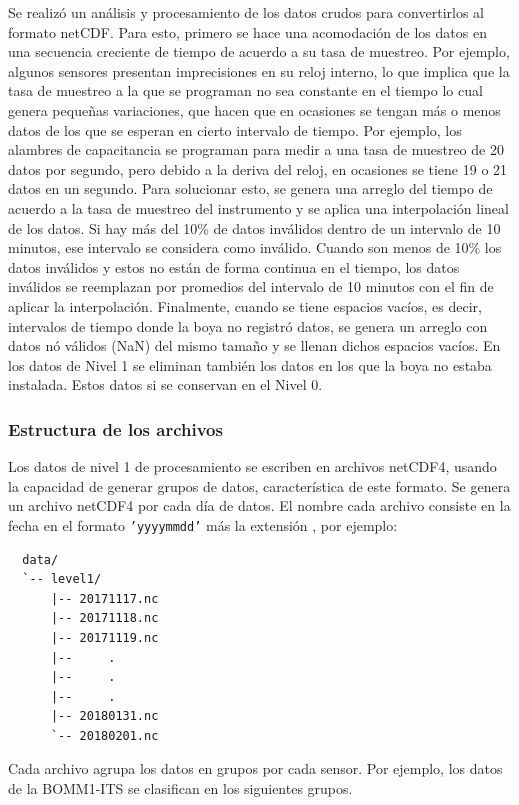 \documentclass[11pt]{article}
\begin{document}
Se realizó un análisis y procesamiento de los datos crudos para convertirlos al
formato netCDF. Para esto, primero se hace una acomodación de los datos en una
secuencia creciente de tiempo de acuerdo a su tasa de muestreo. Por ejemplo,
algunos sensores presentan imprecisiones en su reloj interno, lo que implica que
la tasa de muestreo a la que se programan no sea constante en el tiempo lo cual
genera pequeñas variaciones, que hacen que en ocasiones se tengan más o menos
datos de los que se esperan en cierto intervalo de tiempo. Por ejemplo, los
alambres de capacitancia se programan para medir a una tasa de muestreo de 20
datos por segundo, pero debido a la deriva del reloj, en ocasiones se tiene 19 o
21 datos en un segundo. Para solucionar esto, se genera una arreglo del tiempo
de acuerdo a la tasa de muestreo del instrumento y se aplica una interpolación
lineal de los datos. Si hay más del 10\% de datos inválidos dentro de un
intervalo de 10 minutos, ese intervalo se considera como inválido. Cuando son
menos de 10\% los datos inválidos y estos no están de forma continua en el
tiempo, los datos inválidos se reemplazan por promedios del intervalo de 10
minutos con el fin de aplicar la interpolación.  Finalmente, cuando se tiene
espacios vacíos, es decir, intervalos de tiempo donde la boya no registró datos,
se genera un arreglo con datos nó válidos (NaN) del mismo tamaño y se llenan
dichos espacios vacíos. En los datos de Nivel 1 se eliminan también los datos en
los que la boya no estaba instalada. Estos datos si se conservan en el Nivel 0.

\subsubsection*{Estructura de los archivos}%

Los datos de nivel 1 de procesamiento se escriben en archivos netCDF4, usando la
capacidad de generar grupos de datos, característica de este formato. Se genera
un archivo netCDF4 por cada día de datos. El nombre cada archivo consiste en la
fecha en el formato \texttt{'yyyymmdd'} más la extensión , por
ejemplo:

\begin{verbatim}
  data/
  `-- level1/
      |-- 20171117.nc
      |-- 20171118.nc
      |-- 20171119.nc
      |--     .
      |--     .
      |--     .
      |-- 20180131.nc
      `-- 20180201.nc
\end{verbatim}


Cada archivo agrupa los datos en grupos por cada sensor. Por ejemplo, los datos
de la BOMM1-ITS se clasifican en los siguientes grupos.
\end{document}
